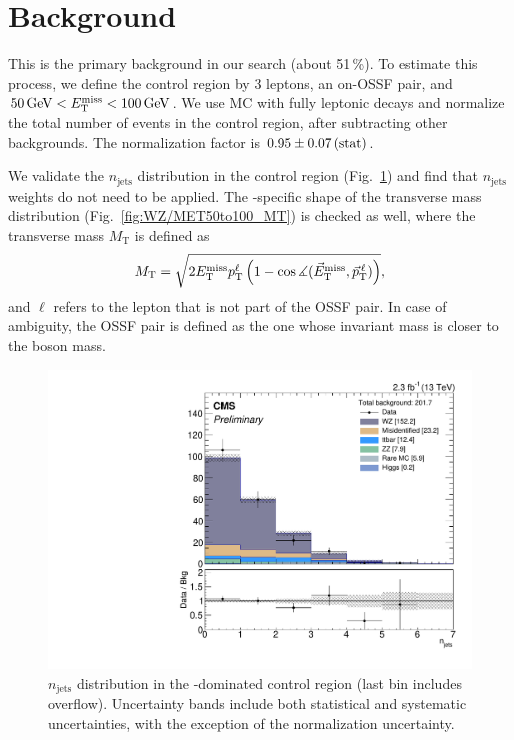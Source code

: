 \section{\texorpdfstring{\WZ}{WZ} Background}
\label{sec:bkg_WZ}

This is the primary background in our search (about 51\,\%). To estimate this process, we define the \WZ control region by 3 leptons, an on-\Z OSSF pair, and $50\,\text{Ge\hspace{-.08em}V} < E_{\mathrm{T}}^{\text{miss}} < 100\,\text{Ge\hspace{-.08em}V}$. We use \WZ MC with fully leptonic decays and normalize the total number of events in the control region, after subtracting other backgrounds. The normalization factor is $0.95 \pm 0.07\,\text{(stat)}$.

We validate the $n_\textrm{jets}$ distribution in the control region (Fig.~\ref{fig:WZ/NGOODJETS}) and find that $n_\textrm{jets}$ weights do not need to be applied. The \WZ-specific shape of the transverse mass distribution (Fig.~\ref{fig:WZ/MET50to100_MT}) is checked as well, where the transverse mass $M_\textrm{T}$ is defined as
$$M_\textrm{T} = \sqrt{2 E_{\mathrm{T}}^{\text{miss}} p_\textrm{T}^\ell \left( 1 - \cos\measuredangle(\vec E_\textrm{T}^\text{miss}, \vec p_\textrm{T}^{\,\ell}) \right)},$$ and $\ell$ refers to the lepton that is not part of the OSSF pair. In case of ambiguity, the OSSF pair is defined as the one whose invariant mass is closer to the \Z boson mass.

\begin{figure}
\begin{center}
	\includegraphics[width=.7\textwidth]{Background/bkg_WZ/WZ_MET50to100_NGOODJETS}
	\caption{$n_\textrm{jets}$ distribution in the \WZ-dominated control region (last bin includes overflow). Uncertainty bands include both statistical and systematic uncertainties, with the exception of the \WZ normalization uncertainty. 
	\label{fig:WZ/NGOODJETS}}
\end{center}
\end{figure}


